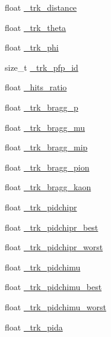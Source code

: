 \begin{DoxyCompactItemize}
float \hyperlink{classselection_1_1NuMuSelection_a4d2e1ceec2811a4493f964212b744e26}{\-\_\-trk\-\_\-distance}
\item 
float \hyperlink{classselection_1_1NuMuSelection_a2041fd7980c1dbe98ce5a4c77a305167}{\-\_\-trk\-\_\-theta}
\item 
float \hyperlink{classselection_1_1NuMuSelection_aeb0b180b3bbe753b576c4db2fa3f94af}{\-\_\-trk\-\_\-phi}
\item 
size\-\_\-t \hyperlink{classselection_1_1NuMuSelection_acbc163e95eec5a3bbbf3648480737a56}{\-\_\-trk\-\_\-pfp\-\_\-id}
\item 
float \hyperlink{classselection_1_1NuMuSelection_a550c6e1bb4c959af5f5724b122b39999}{\-\_\-hits\-\_\-ratio}
\item 
float \hyperlink{classselection_1_1NuMuSelection_a14e0373dc5bdb3b21399f45b7313294c}{\-\_\-trk\-\_\-bragg\-\_\-p}
\item 
float \hyperlink{classselection_1_1NuMuSelection_a51cf3e575038967284eb7ff10eeba9e0}{\-\_\-trk\-\_\-bragg\-\_\-mu}
\item 
float \hyperlink{classselection_1_1NuMuSelection_acf6657ef58eba53a46c0a8c9057ff170}{\-\_\-trk\-\_\-bragg\-\_\-mip}
\item 
float \hyperlink{classselection_1_1NuMuSelection_ae68f8cd5aba5ad848ac6ef0576ce6039}{\-\_\-trk\-\_\-bragg\-\_\-pion}
\item 
float \hyperlink{classselection_1_1NuMuSelection_a8fb54244ae254a42f6238bca2d7fb34e}{\-\_\-trk\-\_\-bragg\-\_\-kaon}
\item 
float \hyperlink{classselection_1_1NuMuSelection_af65eea94c4d2811de82693751684131d}{\-\_\-trk\-\_\-pidchipr}
\item 
float \hyperlink{classselection_1_1NuMuSelection_ad0b2f58434040e2c9e9304a93252d5e1}{\-\_\-trk\-\_\-pidchipr\-\_\-best}
\item 
float \hyperlink{classselection_1_1NuMuSelection_a0373f32c36b713af9febf4e5e3b6899a}{\-\_\-trk\-\_\-pidchipr\-\_\-worst}
\item 
float \hyperlink{classselection_1_1NuMuSelection_a3ae2c291adeedd490d43b915257553f7}{\-\_\-trk\-\_\-pidchimu}
\item 
float \hyperlink{classselection_1_1NuMuSelection_a5bdc83ae76241b73654f99768ea43ffb}{\-\_\-trk\-\_\-pidchimu\-\_\-best}
\item 
float \hyperlink{classselection_1_1NuMuSelection_ad1761cb4833e688d27f6f95321156136}{\-\_\-trk\-\_\-pidchimu\-\_\-worst}
\item 
float \hyperlink{classselection_1_1NuMuSelection_ae2b400954b0bce9930437be4fdb7fd85}{\-\_\-trk\-\_\-pida}

\end{DoxyCompactItemize}
